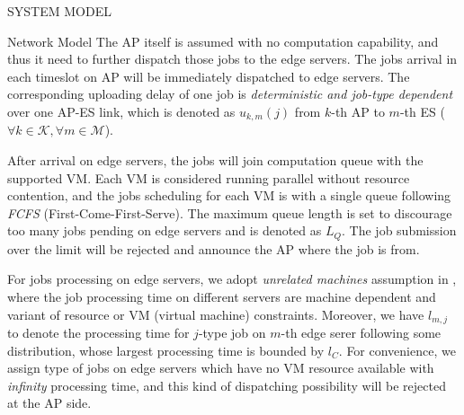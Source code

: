 \documentclass[10pt, conference, letterpaper]{IEEEtran}
\newcommand{\apSet}{\mathcal{K}}
\newcommand{\esSet}{\mathcal{M}}
\begin{document}
\begin{section}{SYSTEM MODEL}
\begin{subsection}{Network Model}
            The AP itself is assumed with no computation capability, and thus it need to further dispatch those jobs to the edge servers.
            The jobs arrival in each timeslot on AP will be immediately dispatched to edge servers.
            The corresponding uploading delay of one job is \emph{deterministic and job-type dependent} over one AP-ES link, which is denoted as $u_{k,m}(j)$ from $k$-th AP to $m$-th ES ($\forall k\in\apSet, \forall m\in\esSet$).

            After arrival on edge servers, the jobs will join computation queue with the supported VM.
            Each VM is considered running parallel without resource contention, and the jobs scheduling for each VM is with a single queue following \emph{FCFS} (First-Come-First-Serve).
            {\color{red}The maximum queue length is set to discourage too many jobs pending on edge servers and is denoted as $L_Q$. The job submission over the limit will be rejected and announce the AP where the job is from.}

            {\color{red}For jobs processing on edge servers, we adopt \emph{unrelated machines} assumption in \cite{tan-online}, where the job processing time on different servers are machine dependent and variant of resource or VM (virtual machine) constraints.
            Moreover, we have $l_{m,j}$ to denote the processing time for $j$-type job on $m$-th edge serer following some distribution, whose largest processing time is bounded by $l_C$.}
            For convenience, we assign type of jobs on edge servers which have no VM resource available with \emph{infinity} processing time, and this kind of dispatching possibility will be rejected at the AP side.
        \end{subsection}


\end{section}
\end{document}
